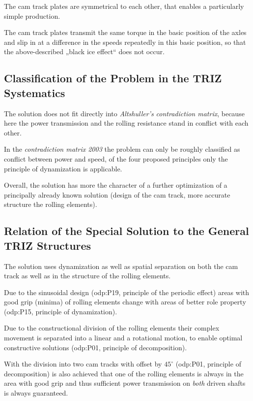 \documentclass[11pt,a4paper]{article}
\begin{document}
The cam track plates are symmetrical to each other, that enables a
particularly simple production.

The cam track plates transmit the same torque in the basic position of the
axles and slip in at a difference in the speeds repeatedly in this basic
position, so that the above-described „black ice effect“ does not occur.

\subsection{Classification of the Problem in the TRIZ Systematics}

The solution does not fit directly into \emph{Altshuller's contradiction
  matrix}, because here the power transmission and the rolling resistance
stand in conflict with each other.

In the \emph{contradiction matrix 2003} the problem can only be roughly
classified as conflict between power and speed, of the four proposed
principles only the principle of dynamization is applicable.

Overall, the solution has more the character of a further optimization of a
principally already known solution (design of the cam track, more accurate
structure the rolling elements).

\subsection{Relation of the Special Solution to the General TRIZ Structures}

The solution uses dynamization as well as spatial separation on both the cam
track as well as in the structure of the rolling elements.

Due to the sinusoidal design (odp:P19, principle of the periodic effect) areas
with good grip (minima) of rolling elements change with areas of better role
property (odp:P15, principle of dynamization).

Due to the constructional division of the rolling elements their complex
movement is separated into a linear and a rotational motion, to enable optimal
constructive solutions (odp:P01, principle of decomposition).

With the division into two cam tracks with offset by $45^\circ$ (odp:P01,
principle of decomposition) is also achieved that one of the rolling elements
is always in the area with good grip and thus sufficient power transmission on
\emph{both} driven shafts is always guaranteed.
\end{document}
